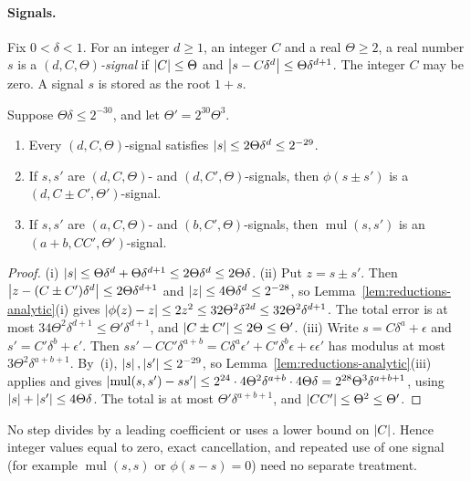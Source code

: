 \paragraph{Signals.}
Fix $0<\delta<1$. For an integer $d\ge1$, an integer $C$ and a real
$\Theta\ge2$, a real number $s$ is a \emph{$(d,C,\Theta)$-signal} if
$\left\lvert C\right\rvert\le\Theta$ and $\left\lvert s-C\delta^d\right\rvert\le\Theta\delta^{d+1}$. The integer $C$
may be zero. A signal $s$ is stored as the root $1+s$.

\begin{lemma}
\label{lem:reductions-signals}
Suppose $\Theta\delta\le2^{-30}$, and let $\Theta'=2^{30}\Theta^3$.
\begin{enumerate}[label=(\roman*)]
\item Every $(d,C,\Theta)$-signal satisfies $\left\lvert s\right\rvert\le2\Theta\delta^d\le2^{-29}$.
\item If $s,s'$ are $(d,C,\Theta)$- and $(d,C',\Theta)$-signals, then
$\phi(s\pm s')$ is a $(d,C\pm C',\Theta')$-signal.
\item If $s,s'$ are $(a,C,\Theta)$- and $(b,C',\Theta)$-signals, then
$\operatorname{mul}(s,s')$ is an $(a+b,CC',\Theta')$-signal.
\end{enumerate}
\end{lemma}

\begin{proof}
(i) $\left\lvert s\right\rvert\le\Theta\delta^d+\Theta\delta^{d+1}\le2\Theta\delta^d\le2\Theta\delta$.
(ii) Put $z=s\pm s'$. Then $\left\lvert z-(C\pm C')\delta^d\right\rvert\le2\Theta\delta^{d+1}$ and
$\left\lvert z\right\rvert\le4\Theta\delta^d\le2^{-28}$, so
Lemma~\ref{lem:reductions-analytic}(i) gives
$\left\lvert\phi(z)-z\right\rvert\le2z^2\le32\Theta^2\delta^{2d}\le32\Theta^2\delta^{d+1}$. The
total error is at most $34\Theta^2\delta^{d+1}\le\Theta'\delta^{d+1}$, and
$\left\lvert C\pm C'\right\rvert\le2\Theta\le\Theta'$.
(iii) Write $s=C\delta^a+\epsilon$ and $s'=C'\delta^b+\epsilon'$. Then
$ss'-CC'\delta^{a+b}=C\delta^a\epsilon'+C'\delta^b\epsilon+\epsilon\epsilon'$ has
modulus at most $3\Theta^2\delta^{a+b+1}$. By~(i), $\left\lvert s\right\rvert,\left\lvert s'\right\rvert\le2^{-29}$,
so Lemma~\ref{lem:reductions-analytic}(iii) applies and gives
$\left\lvert\operatorname{mul}(s,s')-ss'\right\rvert\le2^{24}\cdot4\Theta^2\delta^{a+b}\cdot4\Theta\delta
=2^{28}\Theta^3\delta^{a+b+1}$, using $\left\lvert s\right\rvert+\left\lvert s'\right\rvert\le4\Theta\delta$. The total
is at most $\Theta'\delta^{a+b+1}$, and $\left\lvert CC'\right\rvert\le\Theta^2\le\Theta'$.
\end{proof}

No step divides by a leading coefficient or uses a lower bound on
$\left\lvert C\right\rvert$. Hence integer values equal to zero, exact cancellation, and repeated
use of one signal (for example $\operatorname{mul}(s,s)$ or $\phi(s-s)=0$) need no
separate treatment.

